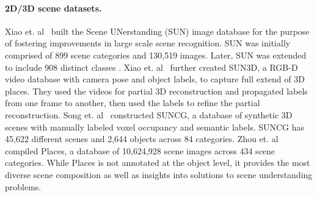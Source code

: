 \documentclass[times, 10pt,twocolumn]{article}
\begin{document}
\paragraph{2D/3D scene datasets.} %
Xiao et. al~\cite{DBLP:conf/cvpr/XiaoHEOT10} built the Scene UNerstanding (SUN) image database for the purpose of fostering improvements in  large scale scene recognition. SUN was initially comprised of 899 scene categories and 130,519 images. Later, SUN was extended to include 908 distinct classes \cite{DBLP:journals/ijcv/XiaoEHTO16}.  Xiao et. al~\cite{DBLP:conf/iccv/XiaoOT13} further created SUN3D, a RGB-D video database with camera pose and object labels, to capture full extend of 3D places. They used the videos for partial 3D reconstruction and propagated labels from one frame to another, then used the labels to refine the partial reconstruction. 
Song et. al~\cite{DBLP:conf/cvpr/SongYZCSF17} constructed SUNCG,  a database of synthetic 3D scenes with manually labeled voxel occupancy and semantic labels. SUNCG has 45,622 different scenes and 2,644 objects across 84 categories. 
Zhou et. al~\cite{DBLP:journals/pami/ZhouLKO018} compiled Places, a database of 10,624,928 scene images across 434 scene categories. While Places is not annotated at the object level, it provides the most diverse scene composition as well as insights into solutions to scene understanding problems. 









\end{document}
